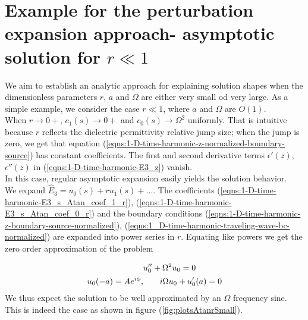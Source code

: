 \documentclass[12pt,twoside]{report}
\begin{document}
\section{Example for the perturbation expansion approach- asymptotic solution for $r \ll 1$  }
\label{sec:perExpansionSmall_r} 
We aim to establish an analytic approach for explaining solution shapes when the dimensionless parameters $r$, $a$ and $\Omega$ are either very small od very large. As a simple example, we consider the case $r \ll 1$, where $a$ and $\Omega$ are $O(1)$.\\
When $r \rightarrow 0+$, $c_1(s) \rightarrow 0+$ and $c_0(s)\rightarrow \Omega^2$ uniformly. That is intuitive because $r$ reflects the dielectric permittivity relative jump size; when the jump is zero, we get that equation (\ref{eqns:1-D-time-harmonic-z-normalized-boundary-source}) has constant coefficients. The first and second derivative terms $\epsilon'(z)$, $\epsilon''(z)$ in (\ref{eqns:1-D-time-harmonic-E3_z}) vanish.\\
In this case, regular asymptotic expansion easily yields the solution behavior. \\
We expand $\hat{E}_3 = u_0(s)+r u_1(s)+ \ldots$. The coefficients (\ref{eqns:1-D-time-harmonic-E3_s_Atan_coef_1_r}), (\ref{eqns:1-D-time-harmonic-E3_s_Atan_coef_0_r}) and the boundary conditions (\ref{eqns:1-D-time-harmonic-z-boundary-source-normalized}), (\ref{eqns:1_D-time-harmonic-traveling-wave-bc-normalized}) are expanded into power series in $r$. Equating like powers we get the zero order approximation of the problem



\begin{align}
\label{eqns:1-D-time-harmonic-E3_s_Atan_coefs-zero-order-per}
&u_0''+\Omega^2 u_0 = 0 \notag\\
u_0(-a) = A e^{i \phi}, &\qquad i \Omega u_0 + u_0'(a) = 0
\end{align} 
We thus expect the solution to be well approximated by an $\Omega$ frequency sine. This is indeed the case as shown in figure (\ref{fig:plotsAtanrSmall}).
\end{document}
